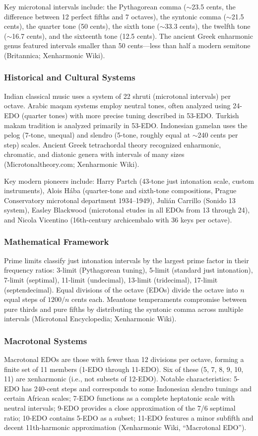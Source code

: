 \documentclass[11pt,letterpaper]{article}
\begin{document}
Key microtonal intervals include: the Pythagorean comma ($\sim$23.5 cents, the difference between 12 perfect fifths and 7 octaves), the syntonic comma ($\sim$21.5 cents), the quarter tone (50 cents), the sixth tone ($\sim$33.3 cents), the twelfth tone ($\sim$16.7 cents), and the sixteenth tone (12.5 cents). The ancient Greek enharmonic genus featured intervals smaller than 50 cents---less than half a modern semitone (Britannica; Xenharmonic Wiki).

\subsubsection{Historical and Cultural Systems}
Indian classical music uses a system of 22 shruti (microtonal intervals) per octave. Arabic maqam systems employ neutral tones, often analyzed using 24-EDO (quarter tones) with more precise tuning described in 53-EDO. Turkish makam tradition is analyzed primarily in 53-EDO. Indonesian gamelan uses the pelog (7-tone, unequal) and slendro (5-tone, roughly equal at $\sim$240 cents per step) scales. Ancient Greek tetrachordal theory recognized enharmonic, chromatic, and diatonic genera with intervals of many sizes (Microtonaltheory.com; Xenharmonic Wiki).

Key modern pioneers include: Harry Partch (43-tone just intonation scale, custom instruments), Alois H\'{a}ba (quarter-tone and sixth-tone compositions, Prague Conservatory microtonal department 1934--1949), Juli\'{a}n Carrillo (Sonido 13 system), Easley Blackwood (microtonal etudes in all EDOs from 13 through 24), and Nicola Vicentino (16th-century archicembalo with 36 keys per octave).

\subsubsection{Mathematical Framework}
Prime limits classify just intonation intervals by the largest prime factor in their frequency ratios: 3-limit (Pythagorean tuning), 5-limit (standard just intonation), 7-limit (septimal), 11-limit (undecimal), 13-limit (tridecimal), 17-limit (septendecimal). Equal divisions of the octave (EDOs) divide the octave into $n$ equal steps of $1200/n$ cents each. Meantone temperaments compromise between pure thirds and pure fifths by distributing the syntonic comma across multiple intervals (Microtonal Encyclopedia; Xenharmonic Wiki).

\subsubsection{Macrotonal Systems}
Macrotonal EDOs are those with fewer than 12 divisions per octave, forming a finite set of 11 members (1-EDO through 11-EDO). Six of these (5, 7, 8, 9, 10, 11) are xenharmonic (i.e., not subsets of 12-EDO). Notable characteristics: 5-EDO has 240-cent steps and corresponds to some Indonesian slendro tunings and certain African scales; 7-EDO functions as a complete heptatonic scale with neutral intervals; 9-EDO provides a close approximation of the 7/6 septimal ratio; 10-EDO contains 5-EDO as a subset; 11-EDO features a minor subfifth and decent 11th-harmonic approximation (Xenharmonic Wiki, ``Macrotonal EDO'').
\end{document}
